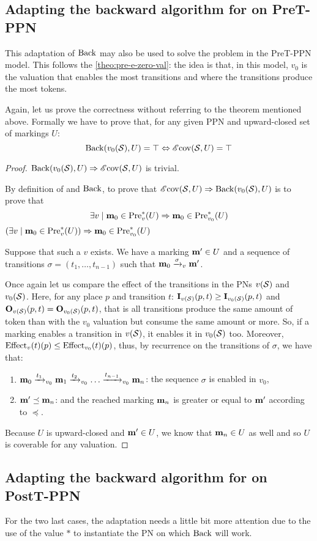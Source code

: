 
\subsection{Adapting the backward algorithm for \Ecov on PreT-\ac{PPN}}

This adaptation of $\back$ may also be used to solve the \Ecov problem in the PreT-\ac{PPN} model.
This follows the \autoref{theo:pre-e-zero-val}:
the idea is that, in this model, $v_0$ is the valuation that enables the most transitions and where the transitions produce the most tokens.

Again, let us prove the correctness without referring to the theorem mentioned above.
Formally we have to prove that, for any given \ac{PPN} \SPTPm and upward-closed set of markings $U$:
  \[
    \back(v_0(\PPN), U) = \top \Leftrightarrow \EcovOp(\PPN, U) = \top
  \]

\begin{proof}
  $\back(v_0(\PPN), U) \Rightarrow \EcovOp(\PPN, U)$ is trivial.

  By definition of \Ecov and $\back$, to prove that $\EcovOp(\PPN, U) \Rightarrow \back(v_0(\PPN), U)$ is to prove that
  \[
    \exists v \mid \mari \in \Pre^*_{v}(U) \Rightarrow \mari \in \Pre^*_{v_0}(U)
  \]
  $ \left( \exists v \mid \mari \in \Pre^*_{v}(U) \right) \Rightarrow \mari \in \Pre^*_{v_0}(U) $

  Suppose that such a $v$ exists. We have a marking $\marp \in U$ and a sequence of transitions $\sigma = (t_1, \dots, t_{n-1})$ such that $\mari \fire[v]{\sigma} \marp$.

  Once again let us compare the effect of the transitions in the \acp{PN} $v(\PPN)$ and $v_0(\PPN)$. Here, for any place $p$ and transition $t$: $\matI_{v(\PPN)}(p,t) \geq \matI_{v_0(\PPN)}(p,t)$ and $\matO_{v(\PPN)}(p,t) = \matO_{v_0(\PPN)}(p,t)$, that is all transitions produce the same amount of token than with the $v_0$ valuation but consume the same amount or more. So, if a marking enables a transition in $v(\PPN)$, it enables it in $v_0(\PPN)$ too. Moreover, $\Effect_v(t)(p) \leq \Effect_{v_0}(t)(p)$, thus, by recurrence on the transitions of $\sigma$, we have that:
  \begin{enumerate}
    \item $\mari \fire[{v_0}]{t_1} \mar_1 \fire[{v_0}]{t_2} \dots \fire[v_0]{t_{n-1}} \mar_n$: the sequence $\sigma$ is enabled in $v_0$,
    \item $\marp \preceq \mar_n$: and the reached marking $\mar_n$ is greater or equal to $\marp$ according to $\preceq$.
  \end{enumerate}

  Because $U$ is upward-closed and $\marp \in U$, we know that $\mar_n \in U$ as well and so $U$ is coverable for any valuation.
\end{proof}

\subsection{Adapting the backward algorithm for \Ecov on PostT-\ac{PPN}}

For the two last cases, the adaptation needs a little bit more attention due to the use of the value $*$ to instantiate the \ac{PN} on which $\back$ will work.

